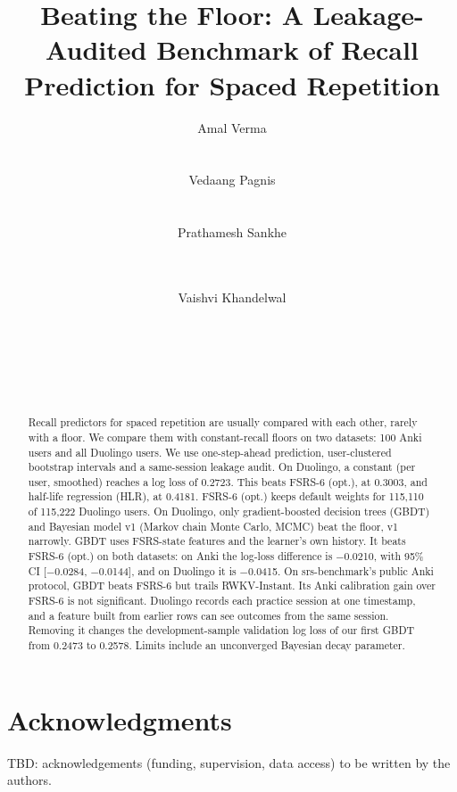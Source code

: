 \documentclass{edm_article}
\title{Beating the Floor: A Leakage-Audited Benchmark of Recall Prediction for Spaced Repetition}
\author{
\alignauthor
Amal Verma\\
\affaddr{Veermata Jijabai Technological Institute (VJTI)}\\
\affaddr{Mumbai, India}\\
\email{\texttt{TBD}}
\alignauthor
Vedaang Pagnis\\
\affaddr{Veermata Jijabai Technological Institute (VJTI)}\\
\affaddr{Mumbai, India}\\
\email{\texttt{TBD}}
\alignauthor
Prathamesh Sankhe\\
\affaddr{Veermata Jijabai Technological Institute (VJTI)}\\
\affaddr{Mumbai, India}\\
\email{\texttt{TBD}}
\and
\alignauthor
Vaishvi Khandelwal\\
\affaddr{Veermata Jijabai Technological Institute (VJTI)}\\
\affaddr{Mumbai, India}\\
\email{\texttt{TBD}}
\alignauthor
[Supervisor name TBD]\\
\affaddr{Veermata Jijabai Technological Institute (VJTI)}\\
\affaddr{Mumbai, India}\\
\email{\texttt{TBD}}
}
\begin{document}
\maketitle

\begin{abstract}
Recall predictors for spaced repetition are usually compared with each other, rarely with a floor.
We compare them with constant-recall floors on two datasets: 100 Anki users and all Duolingo users.
We use one-step-ahead prediction, user-clustered bootstrap intervals and a same-session leakage audit.
On Duolingo, a constant (per user, smoothed) reaches a log loss of 0.2723.
This beats FSRS-6 (opt.), at 0.3003, and half-life regression (HLR), at 0.4181.
FSRS-6 (opt.) keeps default weights for 115,110 of 115,222 Duolingo users.
On Duolingo, only gradient-boosted decision trees (GBDT) and Bayesian model v1 (Markov chain Monte Carlo, MCMC) beat the floor, v1 narrowly.
GBDT uses FSRS-state features and the learner's own history.
It beats FSRS-6 (opt.) on both datasets: on Anki the log-loss difference is $-$0.0210, with 95\% CI [$-$0.0284, $-$0.0144], and on Duolingo it is $-$0.0415.
On srs-benchmark's public Anki protocol, GBDT beats FSRS-6 but trails RWKV-Instant.
Its Anki calibration gain over FSRS-6 is not significant.
Duolingo records each practice session at one timestamp, and a feature built from earlier rows can see outcomes from the same session.
Removing it changes the development-sample validation log loss of our first GBDT from 0.2473 to 0.2578.
Limits include an unconverged Bayesian decay parameter.
\end{abstract}











\section{Acknowledgments}
TBD: acknowledgements (funding, supervision, data access) to be written by the authors.



\end{document}

